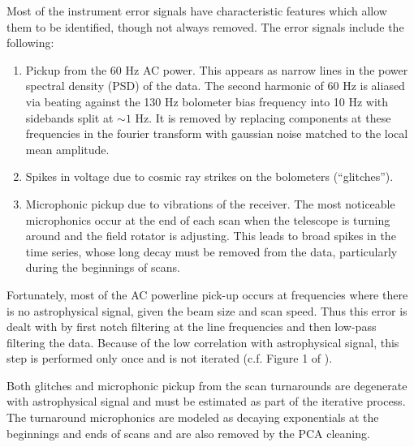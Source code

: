 \documentclass{emulateapj}
\begin{document}
Most of the instrument error signals have characteristic features
which allow them to be identified, though not always removed.  The
error signals include the following:
\begin{enumerate}

\item Pickup from the 60 Hz AC power.  This appears as narrow lines in
    the power spectral density (PSD) of the data.  The second harmonic
    of 60 Hz is aliased via beating against the 130 Hz bolometer bias
    frequency into 10 Hz with sidebands split at $\sim1$ Hz.  It is
    removed by replacing components at these frequencies in the
    fourier transform with gaussian noise matched to the local mean
    amplitude.

\item Spikes in voltage due to cosmic ray strikes on the bolometers
(``glitches'').

\item Microphonic pickup due to vibrations of the receiver.  The most
noticeable microphonics occur at the end of each scan when the
telescope is turning around and the field rotator is adjusting.  This
leads to broad spikes in the time series, whose long decay must be
removed from the data, particularly during the beginnings of scans.


\end{enumerate}

Fortunately, most of the AC powerline pick-up occurs at frequencies
where there is no astrophysical signal, given the beam size and scan
speed.  Thus this error is dealt with by first notch filtering at the
line frequencies and then low-pass filtering the data.  Because of the
low correlation with astrophysical signal, this step is performed only
once and is not iterated (c.f. Figure 1 of \citet{sayers09}).

Both glitches and microphonic pickup from the scan turnarounds are
degenerate with astrophysical signal and must be estimated as part of
the iterative process.  
The turnaround microphonics are modeled as decaying exponentials at the
beginnings and ends of scans and are also removed by the PCA cleaning.
\end{document}
